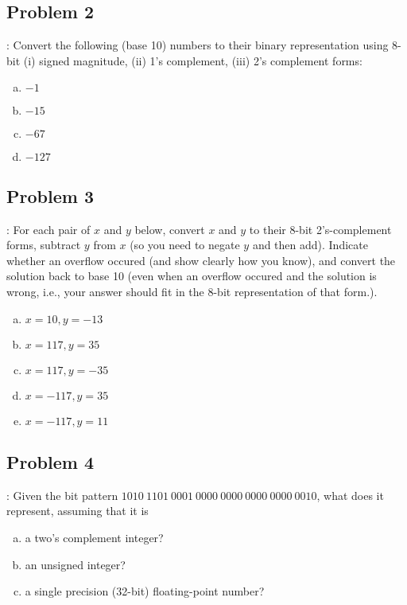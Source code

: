 \documentclass{../slides}
\begin{document}
\subsection{Problem 2}
\begin{frame}{\secname: \subsecname}
    Convert the following (base 10) numbers to their binary representation using 8-bit (i) signed magnitude, (ii) 1’s complement, (iii) 2’s complement forms:
    \begin{enumerate}[(a)]
        \item $-1$
        \item $-15$
        \item $-67$
        \item $-127$
    \end{enumerate}
\end{frame}

\subsection{Problem 3}
\begin{frame}{\secname: \subsecname}
    For each pair of $x$ and $y$ below, convert $x$ and $y$ to their 8-bit 2’s-complement forms, subtract $y$ from $x$ (so you need to negate $y$ and then add). Indicate whether an overflow occured (and show clearly how you know), and convert the solution back to base 10 (even when an overflow occured and the solution is wrong, i.e., your answer should fit in the 8-bit representation of that form.).
    \begin{enumerate}[(a)]
        \item $x = 10, y = -13$
        \item $x = 117, y = 35$
        \item $x = 117, y = -35$
        \item $x = -117, y = 35$
        \item $x = -117, y = 11$
    \end{enumerate}
\end{frame}

\subsection{Problem 4}
\begin{frame}{\secname: \subsecname}
    Given the bit pattern $1010\ 1101\ 0001\ 0000\ 0000\ 0000\ 0000\ 0010$, what does it represent, assuming that it is
    \begin{enumerate}[(a)]
        \item a two's complement integer?
        \item an unsigned integer?
        \item a single precision (32-bit) floating-point number?
    \end{enumerate}
\end{frame}
\end{document}
